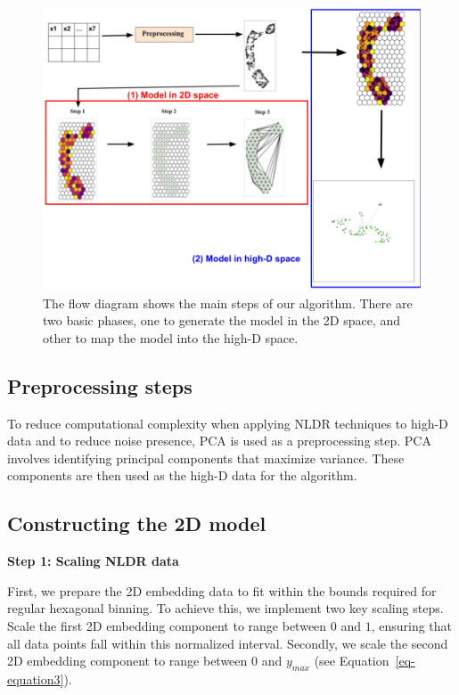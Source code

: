 \documentclass[
  12pt]{article}
\begin{document}
\begin{figure}

{\centering \includegraphics[width=1\textwidth,height=1\textheight]{figures/workflow.png}

}

\caption{\label{fig-meth}The flow diagram shows the main steps of our
algorithm. There are two basic phases, one to generate the model in the
2D space, and other to map the model into the high-D space.}

\end{figure}

\hypertarget{preprocessing-steps}{%
\subsection{Preprocessing steps}\label{preprocessing-steps}}

To reduce computational complexity when applying NLDR techniques to
high-D data and to reduce noise presence, PCA \citep[\citet{article68},
\citet{article69}]{article67} is used as a preprocessing step. PCA
involves identifying principal components that maximize variance. These
components are then used as the high-D data for the algorithm.

\hypertarget{sec-construct2d}{%
\subsection{Constructing the 2D model}\label{sec-construct2d}}

\textbf{Step 1: Scaling NLDR data}

First, we prepare the 2D embedding data to fit within the bounds
required for regular hexagonal binning. To achieve this, we implement
two key scaling steps. Scale the first 2D embedding component to range
between \(0\) and \(1\), ensuring that all data points fall within this
normalized interval. Secondly, we scale the second 2D embedding
component to range between \(0\) and \(y_{max}\) (see
Equation~\ref{eq-equation3}).
\end{document}

